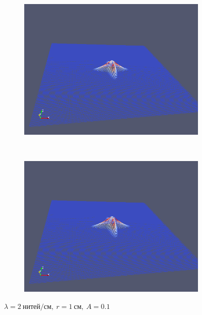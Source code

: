 \begin{figure}[H]
\begin{subfigure}[t]{0.5\textwidth}
        \includegraphics[width=\textwidth]{img/fiber/density_2_radius_1_amplitude_0.1/5.png}
    \end{subfigure}%
    ~
    \begin{subfigure}[t]{0.5\textwidth}
        \centering
        \includegraphics[width=\textwidth]{img/fiber/density_2_radius_1_amplitude_0.1/6.png}
    \end{subfigure}
    \caption{$\lambda=2~нитей/см,~r=1~см,~A=0.1$}
\end{figure}
